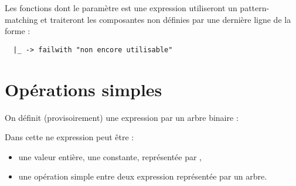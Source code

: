 Les fonctions dont le paramètre est une expression utiliseront un pattern-matching et traiteront les composantes non définies par une dernière ligne de la forme :
 \begin{lstlisting}
  |_ -> failwith "non encore utilisable"
\end{lstlisting}

\section{Opérations simples}
On définit (provisoirement) une expression par un arbre binaire :

Dans cette ne expression peut être :
\begin{itemize}
  \item une valeur entière, une constante, représentée par ,
  \item une opération simple entre deux expression représentée par un arbre.  
\end{itemize}

